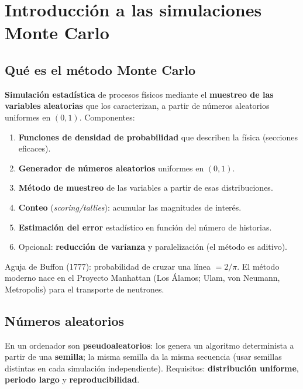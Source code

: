 \chapter[Simulaciones Monte Carlo]{Introducción a las simulaciones\\ Monte Carlo}

\section{Qué es el método Monte Carlo}
\begin{clave}
\textbf{Simulación estadística} de procesos físicos mediante el \textbf{muestreo de las variables aleatorias} que los caracterizan,
a partir de números aleatorios uniformes en $(0,1)$. Componentes:
\begin{enumerate}
\item \textbf{Funciones de densidad de probabilidad} que describen la física (secciones eficaces).
\item \textbf{Generador de números aleatorios} uniformes en $(0,1)$.
\item \textbf{Método de muestreo} de las variables a partir de esas distribuciones.
\item \textbf{Conteo} (\emph{scoring/tallies}): acumular las magnitudes de interés.
\item \textbf{Estimación del error} estadístico en función del número de historias.
\item Opcional: \textbf{reducción de varianza} y paralelización (el método es aditivo).
\end{enumerate}
\end{clave}
\begin{dato}[Historia]
Aguja de Buffon (1777): probabilidad de cruzar una línea $=2/\pi$. El método moderno nace en el Proyecto Manhattan
(Los Álamos; Ulam, von Neumann, Metropolis) para el transporte de neutrones.
\end{dato}

\section{Números aleatorios}
En un ordenador son \textbf{pseudoaleatorios}: los genera un algoritmo determinista a partir de una \textbf{semilla}; la misma
semilla da la misma secuencia (usar semillas distintas en cada simulación independiente). Requisitos:
\textbf{distribución uniforme}, \textbf{periodo largo} y \textbf{reproducibilidad}.

